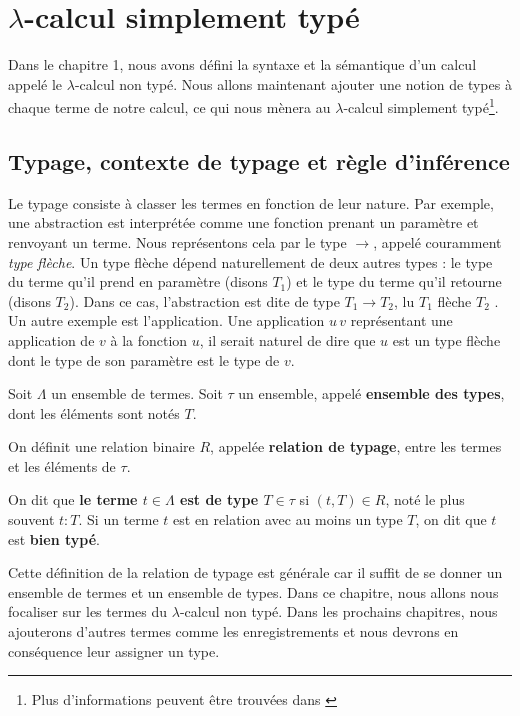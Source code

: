 \chapter{$\lambda$-calcul simplement typé}

Dans le chapitre 1, nous avons défini la syntaxe et la sémantique d'un calcul
appelé le $\lambda$-calcul non typé. Nous allons maintenant ajouter une notion de types à
chaque terme de notre calcul, ce qui nous mènera au $\lambda$-calcul simplement
typé\footnote{Plus d'informations peuvent être trouvées dans \cite{tapl-simply-typed-lambda-calculus}}.

\section{Typage, contexte de typage et règle d'inférence}

Le typage consiste à classer les termes en fonction de leur nature. Par exemple,
une abstraction est interprétée comme une fonction prenant un paramètre et
renvoyant un terme. Nous représentons cela par le type $\rightarrow$, appelé
couramment \textit{type flèche}. Un type flèche dépend naturellement de deux autres types : le
type du terme qu'il prend en paramètre (disons $T_{1}$) et le type du terme
qu'il retourne (disons $T_{2}$). Dans ce cas, l'abstraction est dite de type
$T_{1} \rightarrow T_{2}$, lu \og $T_{1}$ flèche $T_{2}$ \fg. Un
autre exemple est l'application. Une application $u \, v$ représentant une
application de $v$ à la fonction $u$, il serait naturel de dire que $u$ est un
type flèche dont le type de son paramètre est le type de $v$.

\begin{definition} 
  \label{def:simply-typed-lambda-calculus-type-relation}
  Soit $\Lambda$ un ensemble de termes.
  Soit $\tau$ un ensemble, appelé \textbf{ensemble des types}, dont les éléments
  sont notés $T$.

  On définit une relation binaire $R$, appelée \textbf{relation de typage}, entre les
  termes et les éléments de $\tau$.
  
  On dit que \textbf{le terme $t \in \Lambda$ est de type $T \in \tau$} si $(t, T)
  \in R$, noté le plus souvent $t : T$. Si un terme $t$ est en relation avec au
  moins un type $T$, on dit que $t$ est \textbf{bien typé}.
\end{definition}

Cette définition de la relation de typage est générale car il suffit de se
donner un ensemble de termes et un ensemble de types. Dans ce chapitre, nous
allons nous focaliser sur les termes du $\lambda$-calcul non typé. Dans les
prochains chapitres, nous ajouterons d'autres termes comme les enregistrements
et nous devrons en conséquence leur assigner un type.

